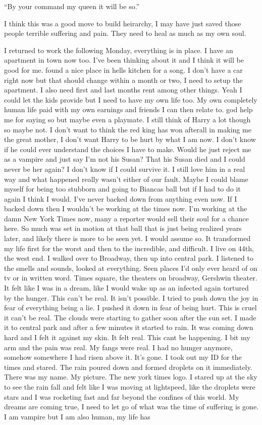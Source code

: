 ``By your command my queen it will be so.''

I think this was a good move to build heirarchy, I may have just saved those people terrible suffering and pain. They need to heal as much as my own soul.

I returned to work the following Monday, everything is in place. I have an apartment in town now too. I've been thinking about it and I think it will be good for me. found a nice place in hells kitchen for a song. I don't have a car right now but that should change within a month or two, I need to setup the apartment. I also need first and last months rent among other things. Yeah I could let the kids provide but I need to have my own life too. My own completely human life paid with my own earnings and friends I can then relate to. god help me for saying so but maybe even a playmate. I still think of Harry a lot though so maybe not. I don't want to think the red king has won afterall in making me the great mother, I don't want Harry to be hurt by what I am now. I don't know if he could ever understand the choices I have to make. Would he just reject me as a vampire and just say I'm not his Susan? That his Susan died and I could never be her again? I don't know if I could survive it. I still love him in a real way and what happened really wasn't either of our fault. Maybe I could blame myself for being too stubborn and going to Biancas ball but if I had to do it again I think I would. I've never backed down from anything even now. If I backed down then I wouldn't be working at the times now. I'm working at the damn New York Times now, many a reporter would sell their soul for a chance here. So much was set in motion at that ball that is just being realized years later, and likely there is more to be seen yet. I would assume so. It transformed my life first for the worst and then to the incredible, and difficult. I live on 44th, the west end. I walked over to Broadway, then up into central park. I listened to the smells and sounds, looked at everything. Seen places I'd only ever heard of  on tv or in written word. Times square, the theaters on broadway, Gershwin theater. It felt like I was in a dream, like I would wake up as an infected again tortured by the hunger. This can't be real. It isn't possible. I tried to push down the joy in fear of everything being a lie. I pushed it down in fear of being hurt. This is cruel it can't be real. The clouds were starting to gather soon after the sun set. I made it to central park and after a few minutes it started to rain. It was coming down hard and I felt it against my skin. It felt real. This cant be happening. I bit my arm and the pain was real. My fangs were real. I had no hunger anymore, somehow somewhere I had risen above it. It's gone. I took out my ID for the times and stared. The rain poured down and formed droplets on it immediately. There was my name. My picture. The new york times logo. I stared up at the sky to see the rain fall and felt like I was moving at lightspeed, like the droplets were stars and I was rocketing fast and far beyond the confines of this world. My dreams are coming true, I need to let go of what was the time of suffering is gone. I am vampire but I am also human, my life has 